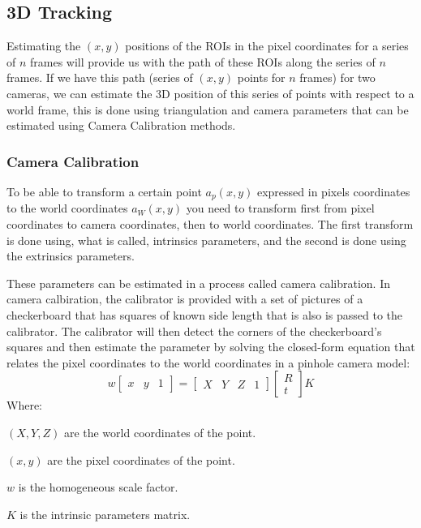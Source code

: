\documentclass[journal]{IEEEtran}
\begin{document}
\subsection{3D Tracking}
Estimating the $(x,y)$ positions of the ROIs in the pixel coordinates for a series of $n$ frames will provide us with the path of these ROIs along the series of $n$ frames. If we have this path (series of $(x,y)$ points for $n$ frames) for two cameras, we can estimate the 3D position of this series of points with respect to a world frame, this is done using triangulation and camera parameters that can be estimated using Camera Calibration methods.
\subsubsection{Camera Calibration}
To be able to transform a certain point $a_p(x,y)$ expressed in pixels coordinates to the world coordinates $a_W(x,y)$ you need to transform first from pixel coordinates to camera coordinates, then to world coordinates. The first transform is done using, what is called, intrinsics parameters, and the second is done using the extrinsics parameters.

These parameters can be estimated in a process called camera calibration. In camera calbiration, the calibrator is provided with a set of pictures of a checkerboard that has squares of known side length that is also is passed to the calibrator. The calibrator will then detect the corners of the checkerboard's squares and then estimate the parameter by solving the closed-form equation that relates the pixel coordinates to the world coordinates in a pinhole camera model:
\begin{equation} \label{CameraModel}
w\begin{bmatrix}
x & y & 1
\end{bmatrix} = 
\begin{bmatrix}
X & Y & Z & 1
\end{bmatrix}  
\begin{bmatrix}
R\\ t
\end{bmatrix} 
K
\end{equation}
Where:

$(X, Y, Z)$ are the world coordinates of the point.

$(x,y)$ are the pixel coordinates of the point.

$w$ is the homogeneous scale factor.

$K$ is the intrinsic parameters matrix.
\end{document}
